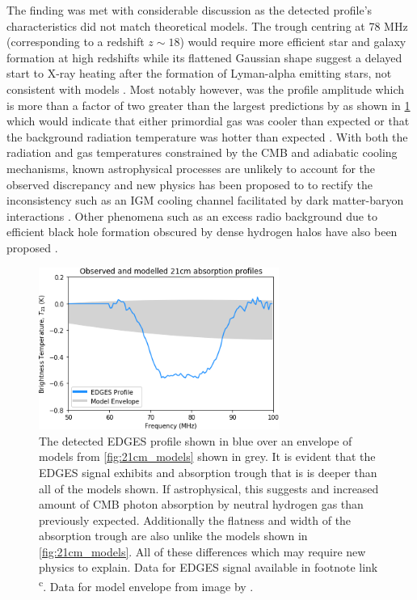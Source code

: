 The finding was met with considerable discussion as the detected profile’s characteristics did not match theoretical models. The trough centring at 78 MHz (corresponding to a redshift $z \sim 18$) would require more efficient star and galaxy formation at high redshifts \citep{edges_star_formation} while its flattened Gaussian shape suggest a delayed start to X-ray heating after the formation of Lyman-alpha emitting stars, not consistent with models \citep{theory_models}. Most notably however, was the profile amplitude which is more than a factor of two greater than the largest predictions by \citet{theory_models} as shown in \cref{fig:edges_signal} which would indicate that either primordial gas was cooler than expected or that the background radiation temperature was hotter than expected \citep{edgesNature}. With both the radiation and gas temperatures constrained by the CMB and adiabatic cooling mechanisms, known astrophysical processes are unlikely to account for the observed discrepancy and new physics has been proposed to to rectify the inconsistency such as an IGM cooling channel facilitated by dark matter-baryon interactions \citep{edgesNature}. Other phenomena such as an excess radio background due to efficient black hole formation obscured by dense hydrogen halos have also been proposed \citep{ew_radio_background}.
\begin{figure}
    \centering
    \includegraphics[width=0.7\textwidth]{edges_signal}
    \caption{The detected EDGES profile shown in blue \citep{edgesNature} over an envelope of models from \cref{fig:21cm_models} shown in grey. It is evident that the EDGES signal exhibits and absorption trough that is is deeper than all of the models shown. If astrophysical, this suggests and increased amount of CMB photon absorption by neutral hydrogen gas than previously expected. Additionally the flatness and width of the absorption trough are also unlike the models shown in \cref{fig:21cm_models}. All of these differences which may require new physics to explain. Data for EDGES signal available in footnote link \textsuperscript{c}. Data for model envelope from image by \citet{theory_models}.}
    \label{fig:edges_signal}
\end{figure}


